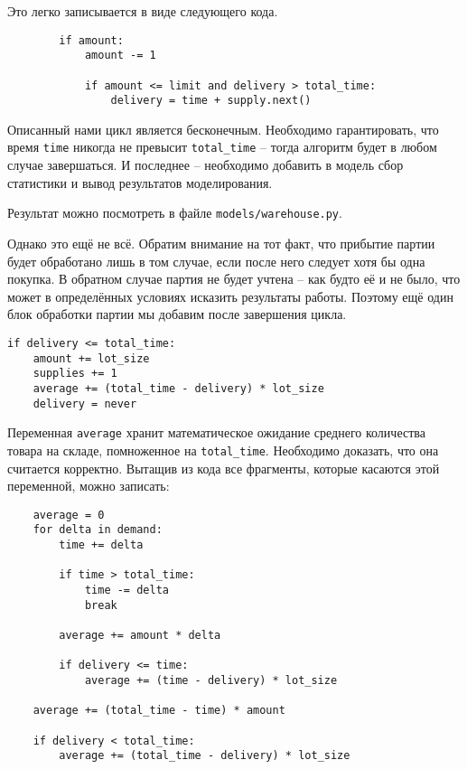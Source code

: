\documentclass[12pt,final]{article}
\begin{document}
Это легко записывается в виде следующего кода.

\begin{verbatim}
        if amount:
            amount -= 1
            
            if amount <= limit and delivery > total_time:
                delivery = time + supply.next()
\end{verbatim}

Описанный нами цикл является бесконечным. Необходимо гарантировать, что время \texttt{time} никогда не превысит \texttt{total\_time} -- тогда алгоритм будет в любом случае завершаться. И последнее -- необходимо добавить в модель сбор статистики и вывод результатов моделирования.

Результат можно посмотреть в файле \texttt{models/warehouse.py}.

Однако это ещё не всё. Обратим внимание на тот факт, что прибытие партии будет обработано лишь в том случае, если после него следует хотя бы одна покупка. В обратном случае партия не будет учтена -- как будто её и не было, что может в определённых условиях исказить результаты работы. Поэтому ещё один блок обработки партии мы добавим после завершения цикла.

\begin{verbatim}
if delivery <= total_time:
    amount += lot_size
    supplies += 1
    average += (total_time - delivery) * lot_size
    delivery = never
\end{verbatim}


Переменная \texttt{average} хранит математическое ожидание среднего количества товара на складе, помноженное на \texttt{total\_time}. Необходимо доказать, что она считается корректно. Вытащив из кода все фрагменты, которые касаются этой переменной, можно записать:

\begin{verbatim}
    average = 0
    for delta in demand:
        time += delta
        
        if time > total_time:
            time -= delta
            break
        
        average += amount * delta
        
        if delivery <= time:
            average += (time - delivery) * lot_size
    
    average += (total_time - time) * amount
    
    if delivery < total_time:
        average += (total_time - delivery) * lot_size
\end{verbatim}
\end{document}
